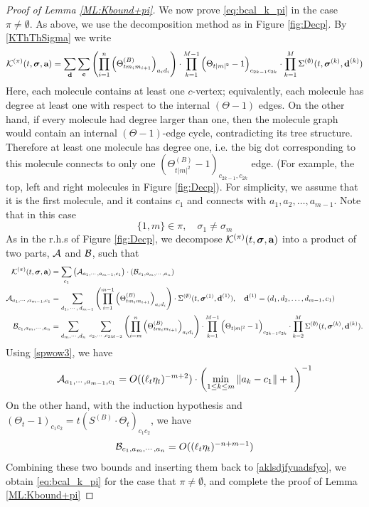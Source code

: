 \documentclass[10pt,reqno]{article}
\theoremstyle{plain} %
\theoremstyle{remark}
\numberwithin{equation}{section}
\begin{document}
\begin{proof}[Proof of Lemma  \ref{ML:Kbound+pi}]
We  now prove  \eqref{eq:bcal_k_pi} in the case $\pi\ne \emptyset$. As above, we use the decomposition method as in Figure \ref{fig:Decp}.  By \eqref{KThThSigma} we write  \begin{align} 
{\cal K}^{(\pi)}(t, \boldsymbol{\sigma}, \textbf{a})=
\sum_{\textbf{d}}\sum_{\textbf{c}}\left(\prod_{i=1}^{n}\left(\Theta^{(B)}_{tm_im_{i+1}}\right)_{a_id_i}\right)\cdot \prod_{k=1}^{M-1}\Big(\Theta_{{t|m|^2}}-1\Big)_{c_{2k-1}c_{2k}}
\cdot
\prod_{k=1}^{M}{\Sigma}^{(\emptyset)}(t, \boldsymbol{\sigma}^{(k)}, \textbf{d}^{(k)})   \end{align}
Here, each molecule contains at least one $c$-vertex; equivalently, each
molecule has degree at least one with respect to the internal $(\Theta-1)$
edges. On the other hand, if every molecule had degree larger than one, then
the molecule graph would contain an internal $(\Theta-1)$-edge cycle,
contradicting its tree structure. Therefore at least one molecule has degree
one, i.e. the big dot corresponding to this molecule connects to only one
$(\Theta^{(B)}_{t|m|^2}-1)_{c_{2k-1},c_{2k}}$ edge. (For example, the top, left and right molecules in Figure \ref{fig:Decp}). For simplicity, we assume that it is the first molecule, and it contains $c_1$ and  connects with $a_1,a_2,\ldots,a_{m-1}$. Note that in this case 
\begin{equation} \label{jjshsaa}
\{1,m \}\in \pi, \quad \sigma_1\ne \sigma_{m }
\end{equation}
As in the r.h.s of Figure \ref{fig:Decp}, we decompose  ${\cal K}^{(\pi)}(t, \boldsymbol{\sigma}, \textbf{a})$ into a  product of two parts,  ${\cal A}$ and ${\cal B}$, such that 
\begin{align} \label{aklsdjfyuadsfyo}
{\cal K}^{(\pi)}(t, \boldsymbol{\sigma}, \textbf{a})
& =
\sum_{c_1} \left({\cal A}_{a_1,\cdots,a_{m-1},c_1}\right)\cdot \left({\cal B}_{c_1, a_m,\cdots,a_{n}}\right)
\\\nonumber
{\cal A}_{a_1,\cdots,a_{m-1},c_1}& =\sum_{d_1,\,\cdots,\,d_{m-1}} \left(\prod_{i=1}^{m-1}\left(\Theta^{(B)}_{tm_im_{i+1}}\right)_{a_id_i}\right)
\cdot
 {\Sigma}^{(\emptyset)}(t, \boldsymbol{\sigma}^{(1)}, \textbf{d}^{(1)}),
 \quad  \textbf{d}^{(1)}  =(d_1,d_2,\ldots,d_{m-1},c_1)  
\\\nonumber
 {\cal B}_{c_1, a_m,\cdots,a_{n}} &=\sum_{d_m,\cdots,d_n}\; \sum_{c_2,\cdots,c_{2M-2}}\left(\prod_{i=m}^{n}\left(\Theta^{(B)}_{tm_im_{i+1}}\right)_{a_id_i}\right)\cdot \prod_{k=1}^{M-1}\Big(\Theta_{{t|m|^2}}-1\Big)_{c_{2k-1}c_{2k}}
\cdot
 \prod_{k=2}^{M}{\Sigma}^{(\emptyset)}(t, \boldsymbol{\sigma}^{(k)}, \textbf{d}^{(k)}). 
\end{align}
Using \eqref{spwow3}, we have 
$$
 {\cal A}_{a_1,\cdots,a_{m-1},c_1}=O((\ell_t\eta_t)^{-m+2})\cdot \left(\min_{1\le k\le m} \|a_k-c_1\|+1\right)^{-1}
$$
On the other hand, with the induction hypothesis and $(\Theta_t-1)_{c_1c_2}=t\left(S^{(B)}\cdot \Theta_t\right)_{c_1c_2}$,   we have 
$$
{\cal B}_{c_1, a_m,\cdots,a_{n}}=O((\ell_t\eta_t)^{-n+m-1})
$$
Combining  these two bounds and inserting  them back to \eqref{aklsdjfyuadsfyo}, we obtain \eqref{eq:bcal_k_pi} for the case that $\pi\ne \emptyset$, and complete the proof of Lemma  \ref{ML:Kbound+pi}


\end{proof}
\end{document}
